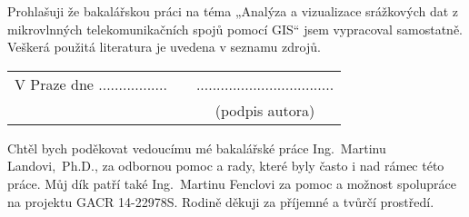 \newcommand{\odsaditodzhora}{\hskip1pt\vfill}

\odsaditodzhora
{}

 \baselineskip

Prohlašuji že bakalářskou práci na téma „Analýza a vizualizace
srážkových dat z mikrovlnných telekomunikačních spojů pomocí GIS“ jsem
vypracoval samostatně. Veškerá použitá literatura je uvedena v seznamu
zdrojů.

\begin{flushleft}
\begin{tabular}{cp{}c}
V Praze dne .................
& 
&
..................................
\\
&&
(podpis autora)
\end{tabular}

\end{flushleft}
\newpage

\odsaditodzhora
{}

 \baselineskip

Chtěl bych poděkovat vedoucímu mé bakalářské práce Ing.~Martinu
Landovi,~Ph.D., za odbornou pomoc a rady, které byly často i nad rámec
této práce. Můj dík patří také Ing.~Martinu Fenclovi za pomoc
a možnost spolupráce na projektu GACR 14-22978S. Rodině děkuji za příjemné a tvůrčí
prostředí.

\newpage
